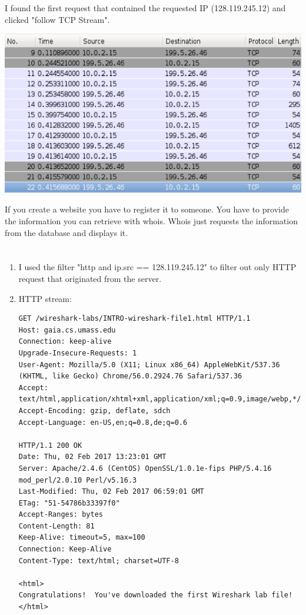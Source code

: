 \documentclass[12pt, a4paper]{article}
\begin{document}
\begin{enumerate}[a]
	I found the first request that contained the requested IP (128.119.245.12) and clicked "follow TCP Stream".

	\includegraphics[width=\linewidth]{images/whois}

	If you create a website you have to register it to someone. You have to provide the information you can retrieve with whois. Whois just requests the information from the database and displays it.
\end{enumerate}

\section{} %
\begin{enumerate}[a]
	\item %
	I used the filter "http and ip.src == 128.119.245.12" to filter out only HTTP request that originated from the server.

	\item %
	HTTP stream:

	\begin{lstlisting}
GET /wireshark-labs/INTRO-wireshark-file1.html HTTP/1.1
Host: gaia.cs.umass.edu
Connection: keep-alive
Upgrade-Insecure-Requests: 1
User-Agent: Mozilla/5.0 (X11; Linux x86_64) AppleWebKit/537.36 (KHTML, like Gecko) Chrome/56.0.2924.76 Safari/537.36
Accept: text/html,application/xhtml+xml,application/xml;q=0.9,image/webp,*/*;q=0.8
Accept-Encoding: gzip, deflate, sdch
Accept-Language: en-US,en;q=0.8,de;q=0.6

HTTP/1.1 200 OK
Date: Thu, 02 Feb 2017 13:23:01 GMT
Server: Apache/2.4.6 (CentOS) OpenSSL/1.0.1e-fips PHP/5.4.16 mod_perl/2.0.10 Perl/v5.16.3
Last-Modified: Thu, 02 Feb 2017 06:59:01 GMT
ETag: "51-54786b33397f0"
Accept-Ranges: bytes
Content-Length: 81
Keep-Alive: timeout=5, max=100
Connection: Keep-Alive
Content-Type: text/html; charset=UTF-8

<html>
Congratulations!  You've downloaded the first Wireshark lab file!
</html>
	\end{lstlisting}
\end{enumerate}
\end{document}
